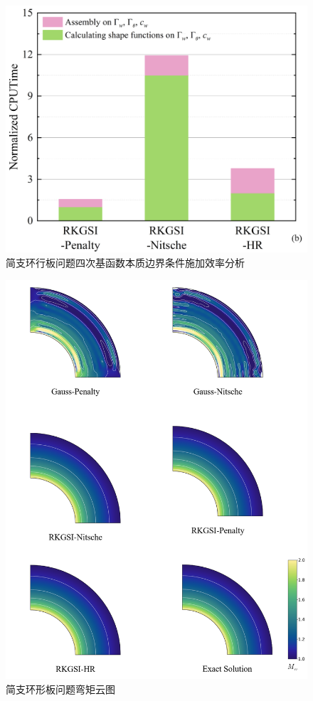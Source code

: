 \begin{figure}[H]
    \centering
    \includegraphics[scale=0.5]{figure/PHR/A/Qefficiency.png}
    \caption{简支环行板问题四次基函数本质边界条件施加效率分析}\label{AQefficiency}
\end{figure}
\newpage
\begin{figure}[H]
    \centering
    \includegraphics[scale=0.5]{figure/PHR/A/Mxy.png}
    \caption{简支环形板问题弯矩云图}\label{AMxy}
\end{figure}
